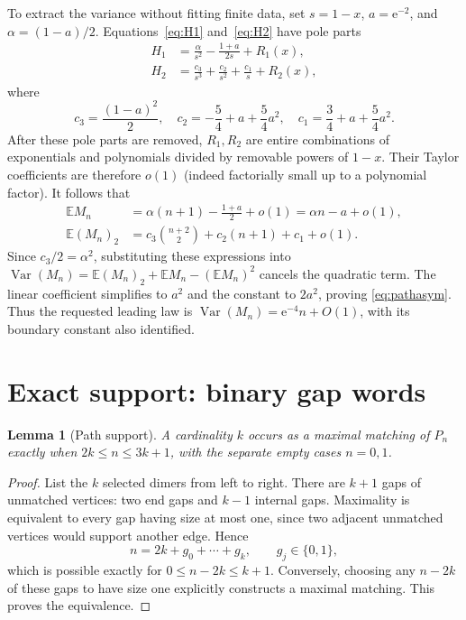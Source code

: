\documentclass[10pt]{article}
\newtheorem{lemma}{Lemma}
\newcommand{\E}{\mathbb E}
\newcommand{\Var}{\operatorname{Var}}
\newcommand{\e}{\mathrm e}
\begin{document}
To extract the variance without fitting finite data, set $s=1-x$,
$a=\e^{-2}$, and $\alpha=(1-a)/2$.  Equations~\eqref{eq:H1}
and~\eqref{eq:H2} have pole parts
\begin{align}
 H_1&=\frac{\alpha}{s^2}-\frac{1+a}{2s}+R_1(x),\label{eq:H1pole}\\
 H_2&=\frac{c_3}{s^3}+\frac{c_2}{s^2}+\frac{c_1}{s}+R_2(x),\label{eq:H2pole}
\end{align}
where
\begin{equation}\label{eq:cs}
 c_3=\frac{(1-a)^2}{2},\quad
 c_2=-\frac54+a+\frac54a^2,\quad
 c_1=\frac34+a+\frac54a^2.
\end{equation}
After these pole parts are removed, $R_1,R_2$ are entire combinations of
exponentials and polynomials divided by removable powers of $1-x$.  Their
Taylor coefficients are therefore $o(1)$ (indeed factorially small up to a
polynomial factor).  It follows that
\begin{align*}
 \E M_n&=\alpha(n+1)-\frac{1+a}{2}+o(1)
       =\alpha n-a+o(1),\\
 \E(M_n)_2&=c_3\binom{n+2}{2}+c_2(n+1)+c_1+o(1).
\end{align*}
Since $c_3/2=\alpha^2$, substituting these expressions into
$\Var(M_n)=\E(M_n)_2+\E M_n-(\E M_n)^2$ cancels the quadratic term.  The
linear coefficient simplifies to $a^2$ and the constant to $2a^2$, proving
\eqref{eq:pathasym}.  Thus the requested leading law is
$\Var(M_n)=\e^{-4}n+O(1)$, with its boundary constant also identified.

\section{Exact support: binary gap words}
\begin{lemma}[Path support]\label{lem:pathsupport}
A cardinality $k$ occurs as a maximal matching of $P_n$ exactly when
$2k\le n\le3k+1$, with the separate empty cases $n=0,1$.
\end{lemma}
\begin{proof}
List the $k$ selected dimers from left to right.  There are $k+1$ gaps of
unmatched vertices: two end gaps and $k-1$ internal gaps.  Maximality is
equivalent to every gap having size at most one, since two adjacent unmatched
vertices would support another edge.  Hence
\[
 n=2k+g_0+\cdots+g_k,\qquad g_j\in\{0,1\},
\]
which is possible exactly for $0\le n-2k\le k+1$.  Conversely, choosing any
$n-2k$ of these gaps to have size one explicitly constructs a maximal
matching.  This proves the equivalence.
\end{proof}
\end{document}
